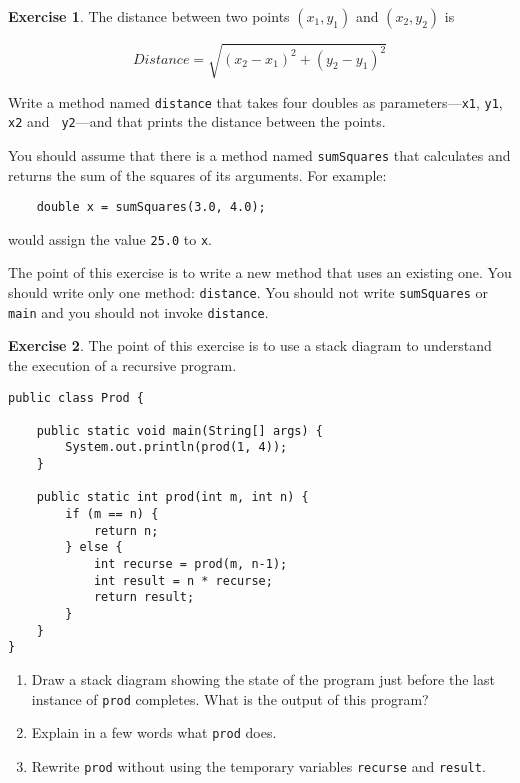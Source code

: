 \documentclass[12pt]{book}
\theoremstyle{definition}
\newtheorem{excz}{Exercise}[chapter]
\newenvironment{exercise}{\bigskip\begin{excz}\mbox{}}{\end{excz}}
\begin{document}
\begin{exercise}
The distance between two points $(x_1, y_1)$ and $(x_2, y_2)$
is

\[Distance = \sqrt{(x_2 - x_1)^2 +(y_2 - y_1)^2} \]

Write a method named {\tt distance} that takes four
doubles as parameters---{\tt x1}, {\tt y1}, {\tt x2} and {\tt
y2}---and that prints the distance between the points.

You should assume that there is a method named {\tt sumSquares}
that calculates and returns the sum of the squares of its arguments.
For example:

\begin{lstlisting}
    double x = sumSquares(3.0, 4.0);
\end{lstlisting}
%
would assign the value {\tt 25.0} to {\tt x}.

The point of this exercise is to write a new method that uses an
existing one.  You should write only one method: {\tt distance}.  You
should not write {\tt sumSquares} or {\tt main} and you should not
invoke {\tt distance}.
\end{exercise}


\begin{exercise}
The point of this exercise is to use a stack diagram to understand
the execution of a recursive program.

\begin{lstlisting}
public class Prod {

    public static void main(String[] args) {
        System.out.println(prod(1, 4));
    }

    public static int prod(int m, int n) {
        if (m == n) {
            return n;
        } else {
            int recurse = prod(m, n-1);
            int result = n * recurse;
            return result;
        }
    }
}
\end{lstlisting}
%
\begin{enumerate}

\item Draw a stack diagram showing the state of the program just
before the last instance of {\tt prod} completes.
What is the output of this program?

\item Explain in a few words what {\tt prod} does.

\item Rewrite {\tt prod} without using the temporary variables
{\tt recurse} and {\tt result}.

\end{enumerate}
\end{exercise}
\end{document}
